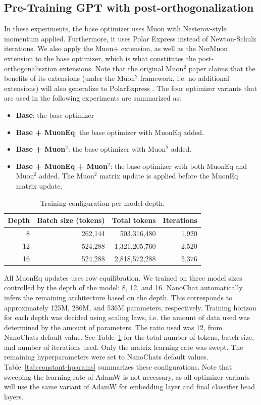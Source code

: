 \documentclass[11pt]{article}
\begin{document}
\subsection{Pre-Training GPT with post-orthogonalization}
\label{Pre-Training GPT with post-orthogonalization}

In these experiments, the base optimizer uses Muon with Nesterov-style momentum applied. Furthermore, it uses Polar Express instead of Newton-Schulz iterations. We also apply the Muon+ extension, as well as the NorMuon extension to the base optimizer, which is what constitutes the post-orthogonalisztion extensions. Note that the original Muon$^2$ paper claims that the benefits of its extensions (under the Muon$^2$ framework, i.e. no additional extensions) will also generalize to PolarExpress \cite{liu-etal-2026-muon2}. The four optimizer variants that are used in the following experiments are summarized as:
\begin{itemize}
    \item \textbf{Base}: the base optimizer
    \item \textbf{Base + MuonEq}: the base optimizer with MuonEq added.
    \item \textbf{Base + Muon$^2$}: the base optimizer with Muon$^2$ added.
    \item \textbf{Base + MuonEq + Muon$^2$}: the base optimizer with both MuonEq and Muon$^2$ added. The Muon$^2$ matrix update is applied before the MuonEq matrix update. 
\end{itemize}

\begin{table}[t]
\centering
\small
\begin{tabular}{rrrr}
\toprule
Depth & Batch size (tokens) & Total tokens & Iterations \\
\midrule
8  & 262{,}144 & 503{,}316{,}480   & 1{,}920 \\
12 & 524{,}288 & 1{,}321{,}205{,}760 & 2{,}520 \\
16 & 524{,}288 & 2{,}818{,}572{,}288 & 5{,}376 \\
\bottomrule
\end{tabular}
\caption{Training configuration per model depth.}
\label{tab:depth-config}
\end{table}


All MuonEq updates uses row equilibration. We trained on three model sizes controlled by the depth of the model: 8, 12, and 16. NanoChat automatically infers the remaining architecture based on the depth. This corresponds to approximately 125M, 286M, and 536M parameters, respectively. Training horizon for each depth was decided using scaling laws, i.e. the amount of data used was determined by the amount of parameters. The ratio used was 12, from NanoChats default value. See Table~\ref{tab:depth-config} for the total number of tokens, batch size, and number of iterations used. Only the matrix learning rate was swept. The remaining hyperparameters were set to NanoChats default values. Table~\ref{tab:constant-hparams} summarizes these configurations. Note that sweeping the learning rate of AdamW is not necessary, as all optimizer variants will use the same variant of AdamW for embedding layer and final classifier head layers. 
\end{document}
